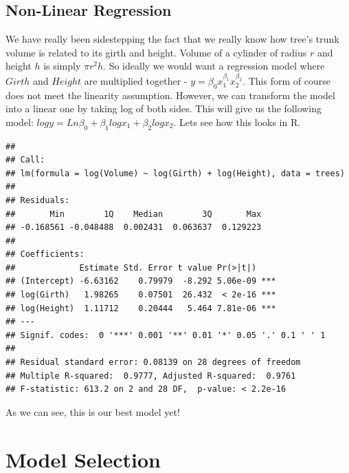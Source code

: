 \documentclass[10pt, letterpaper, twoside]{memoir}\usepackage{knitr}
\begin{document}
\subsection{Non-Linear Regression}

We have really been sidestepping the fact that we really know how tree's trunk volume is related to its girth and height. Volume of a cylinder of radius $r$ and height $h$ is simply $\pi r^2 h$. So ideally we would want a regression model where $Girth$ and $Height$ are multiplied together - $y = \beta_0 x_1^{\beta_1} x_2^{\beta_2}$. This form of course does not meet the linearity assumption. However, we can transform the model into a linear one by taking log of both sides. This will give us the following model: $log y = Ln \beta_0 + \beta_1 log x_1 + \beta_2 log x_2$. Lets see how this looks in R.

\begin{knitrout}
\color{fgcolor}\begin{kframe}
\begin{alltt}
 \hlkwb{<-} \hlstd{(} \hlopt{~}  \hlopt{+}   
\end{alltt}
\begin{verbatim}
## 
## Call:
## lm(formula = log(Volume) ~ log(Girth) + log(Height), data = trees)
## 
## Residuals:
##       Min        1Q    Median        3Q       Max 
## -0.168561 -0.048488  0.002431  0.063637  0.129223 
## 
## Coefficients:
##             Estimate Std. Error t value Pr(>|t|)    
## (Intercept) -6.63162    0.79979  -8.292 5.06e-09 ***
## log(Girth)   1.98265    0.07501  26.432  < 2e-16 ***
## log(Height)  1.11712    0.20444   5.464 7.81e-06 ***
## ---
## Signif. codes:  0 '***' 0.001 '**' 0.01 '*' 0.05 '.' 0.1 ' ' 1
## 
## Residual standard error: 0.08139 on 28 degrees of freedom
## Multiple R-squared:  0.9777,	Adjusted R-squared:  0.9761 
## F-statistic: 613.2 on 2 and 28 DF,  p-value: < 2.2e-16
\end{verbatim}
\end{kframe}
\end{knitrout}

As we can see, this is our best model yet!

\section{Model Selection}
\end{document}
